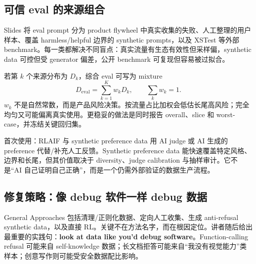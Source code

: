 \subsection{可信 eval 的来源组合}

Slides 将 eval prompt 分为 product flywheel 中真实收集的失败、人工整理的用户样本、覆盖 harmless/helpful 边界的 synthetic prompts，以及 XSTest 等外部 benchmark。每一类都解决不同盲点：真实流量有生态有效性但采样偏，synthetic data 可控但受 generator 偏差，公开 benchmark 可复现但容易被过拟合。


若第 $k$ 个来源分布为 $D_k$，综合 eval 可写为 mixture
\[
D_{\text{eval}}=\sum_{k=1}^{K}w_kD_k,
\qquad \sum_k w_k=1.
\]
$w_k$ 不是自然常数，而是产品风险决策。按流量占比加权会低估长尾高风险；完全均匀又可能偏离真实使用。更稳妥的做法是同时报告 overall、slice 和 worst-case，并冻结关键回归集。

\begin{knowledgebox}{首次使用：RLAIF 与 synthetic preference data}
用 AI judge 或 AI 生成的 preference 代替/补充人工反馈。Synthetic preference data 能快速覆盖特定风格、边界和长尾，但其价值取决于 diversity、judge calibration 与抽样审计。它不是“AI 自己证明自己正确”，而是一个仍需外部验证的数据生产流程。
\end{knowledgebox}

\subsection{修复策略：像 debug 软件一样 debug 数据}

General Approaches 包括清理/正则化数据、定向人工收集、生成 anti-refusal synthetic data，以及直接 RL。关键不在方法名字，而在根因定位。讲者随后给出最重要的实践句：\textbf{look at data like you'd debug software}。Function-calling refusal 可能来自 self-knowledge 数据；长文档拒答可能来自“我没有视觉能力”类样本；创意写作则可能受安全数据配比影响。




